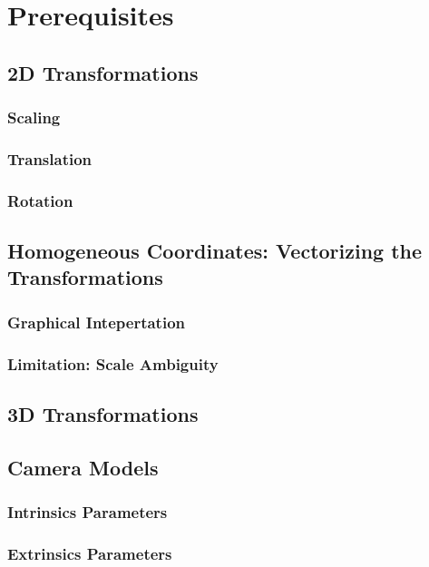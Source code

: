 \documentclass{book}
\begin{document}
    \chapter{Prerequisites}
        \section{2D Transformations}
            \subsection{Scaling}

            \subsection{Translation}

            \subsection{Rotation}

        \section{Homogeneous Coordinates: Vectorizing the Transformations}
            \subsection{Graphical Intepertation}

            \subsection{Limitation: Scale Ambiguity}

        \section{3D Transformations}

        \section{Camera Models}
            \subsection{Intrinsics Parameters}

            \subsection{Extrinsics Parameters}
\end{document}
